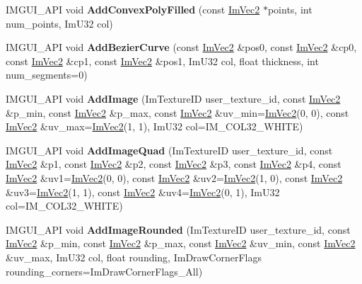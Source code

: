 \begin{DoxyCompactItemize}
\item 
\mbox{\label{structImDrawList_ad2accc0a74845b08bd0e6fae6183d6d0}} 
I\+M\+G\+U\+I\+\_\+\+A\+PI void {\bfseries Add\+Convex\+Poly\+Filled} (const \hyperlink{structImVec2}{Im\+Vec2} $\ast$points, int num\+\_\+points, Im\+U32 col)
\item 
\mbox{\label{structImDrawList_afd2eeeb8ed23b6222513953b03620101}} 
I\+M\+G\+U\+I\+\_\+\+A\+PI void {\bfseries Add\+Bezier\+Curve} (const \hyperlink{structImVec2}{Im\+Vec2} \&pos0, const \hyperlink{structImVec2}{Im\+Vec2} \&cp0, const \hyperlink{structImVec2}{Im\+Vec2} \&cp1, const \hyperlink{structImVec2}{Im\+Vec2} \&pos1, Im\+U32 col, float thickness, int num\+\_\+segments=0)
\item 
\mbox{\label{structImDrawList_ac1f529d53d7ba118484e47e49218c603}} 
I\+M\+G\+U\+I\+\_\+\+A\+PI void {\bfseries Add\+Image} (Im\+Texture\+ID user\+\_\+texture\+\_\+id, const \hyperlink{structImVec2}{Im\+Vec2} \&p\+\_\+min, const \hyperlink{structImVec2}{Im\+Vec2} \&p\+\_\+max, const \hyperlink{structImVec2}{Im\+Vec2} \&uv\+\_\+min=\hyperlink{structImVec2}{Im\+Vec2}(0, 0), const \hyperlink{structImVec2}{Im\+Vec2} \&uv\+\_\+max=\hyperlink{structImVec2}{Im\+Vec2}(1, 1), Im\+U32 col=I\+M\+\_\+\+C\+O\+L32\+\_\+\+W\+H\+I\+TE)
\item 
\mbox{\label{structImDrawList_abf9199e08d17fd33736fd67598485341}} 
I\+M\+G\+U\+I\+\_\+\+A\+PI void {\bfseries Add\+Image\+Quad} (Im\+Texture\+ID user\+\_\+texture\+\_\+id, const \hyperlink{structImVec2}{Im\+Vec2} \&p1, const \hyperlink{structImVec2}{Im\+Vec2} \&p2, const \hyperlink{structImVec2}{Im\+Vec2} \&p3, const \hyperlink{structImVec2}{Im\+Vec2} \&p4, const \hyperlink{structImVec2}{Im\+Vec2} \&uv1=\hyperlink{structImVec2}{Im\+Vec2}(0, 0), const \hyperlink{structImVec2}{Im\+Vec2} \&uv2=\hyperlink{structImVec2}{Im\+Vec2}(1, 0), const \hyperlink{structImVec2}{Im\+Vec2} \&uv3=\hyperlink{structImVec2}{Im\+Vec2}(1, 1), const \hyperlink{structImVec2}{Im\+Vec2} \&uv4=\hyperlink{structImVec2}{Im\+Vec2}(0, 1), Im\+U32 col=I\+M\+\_\+\+C\+O\+L32\+\_\+\+W\+H\+I\+TE)
\item 
\mbox{\label{structImDrawList_a6e4e419cf8997ea8e1f83d31c533ec91}} 
I\+M\+G\+U\+I\+\_\+\+A\+PI void {\bfseries Add\+Image\+Rounded} (Im\+Texture\+ID user\+\_\+texture\+\_\+id, const \hyperlink{structImVec2}{Im\+Vec2} \&p\+\_\+min, const \hyperlink{structImVec2}{Im\+Vec2} \&p\+\_\+max, const \hyperlink{structImVec2}{Im\+Vec2} \&uv\+\_\+min, const \hyperlink{structImVec2}{Im\+Vec2} \&uv\+\_\+max, Im\+U32 col, float rounding, Im\+Draw\+Corner\+Flags rounding\+\_\+corners=Im\+Draw\+Corner\+Flags\+\_\+\+All)

\end{DoxyCompactItemize}

